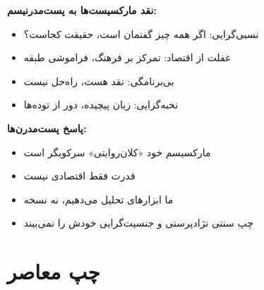 \begin{debatebox}
\textbf{نقد مارکسیست‌ها به پست‌مدرنیسم:}
\begin{itemize}[nosep]
    \item نسبی‌گرایی: اگر همه چیز گفتمان است، حقیقت کجاست؟
    \item غفلت از اقتصاد: تمرکز بر فرهنگ، فراموشی طبقه
    \item بی‌برنامگی: نقد هست، راه‌حل نیست
    \item نخبه‌گرایی: زبان پیچیده، دور از توده‌ها
\end{itemize}

\textbf{پاسخ پست‌مدرن‌ها:}
\begin{itemize}[nosep]
    \item مارکسیسم خود «کلان‌روایتی» سرکوبگر است
    \item قدرت فقط اقتصادی نیست
    \item ما ابزارهای تحلیل می‌دهیم، نه نسخه
    \item چپ سنتی نژادپرستی و جنسیت‌گرایی خودش را نمی‌بیند
\end{itemize}
\end{debatebox}

\section{چپ معاصر}

